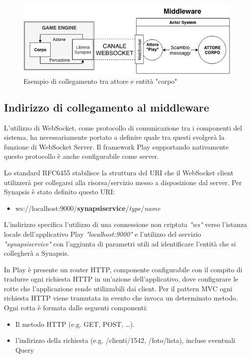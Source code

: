 \begin{figure}[H]
\centering
\includegraphics[width=\textwidth]{figures/Middleware_entita_attore.png}
\caption{Esempio di collegamento tra attore e entità "corpo"}
\end{figure}

\subsection{Indirizzo di collegamento al middleware}

L'utilizzo di WebSocket, come protocollo di comunicazione tra i componenti del sistema, ha necessariamente portato a definire quale tra questi svolgerà la funzione di WebSocket Server. Il framework Play supportando nativamente questo protocollo è anche configurabile come server.

\medskip

Lo standard RFC6455 stabilisce la struttura del URI che il WebSocket client utilizzerà per collegarsi alla risorsa/servizio messo a disposizione dal server. Per Synapsis è stato definito questo URI:
\begin{itemize}
    \item ws://localhost:9000/\textbf{synapsiservice}/\textit{type}/\textit{name}
\end{itemize}

L'indirizzo specifica l'utilizzo di una connessione non criptata \textit{"ws"} verso l'istanza locale dell'applicativo Play \textit{"localhost:9000"} e l'utilizzo del servizio \textit{"synapsiservice"} con l'aggiunta di parametri utili ad identificare l'entità che si collegherà a Synapsis. 

\medskip

In Play è presente un router HTTP, componente configurabile con il compito di tradurre ogni richiesta HTTP in un'azione dell'applicativo, dove configurare le rotte che l'applicazione rende utilizzabili dai client. Per il pattern MVC ogni richiesta HTTP viene tramutata in evento che invoca un determinato metodo. Ogni rotta è formata dalle seguenti componenti:
\begin{itemize}
    \item Il metodo HTTP (e.g. GET, POST, …).
    \item l'indirizzo della richiesta (e.g. /clienti/1542, /foto/lista), incluse eventuali Query
\end{itemize}


